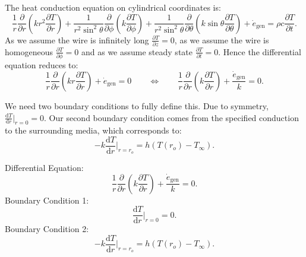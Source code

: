 \clearpage
\begin{derivation}
  \derivationpart
  The heat conduction equation on cylindrical coordinates is:
  \begin{equation*}
    \frac{1}{r} \frac{\partial }{\partial r} \left( k r^2 \frac{\partial T}{\partial r}  \right)+ \frac{1}{r^2 \sin^2 \theta} \frac{\partial }{\partial \phi} \left( k \frac{\partial T}{\partial \phi}  \right) + \frac{1}{r^2 \sin^2 \theta} \frac{\partial }{\partial \theta}  \left( k \sin \theta \frac{\partial T}{\partial \theta}  \right) + \dot{e}_{\text{gen}} = \rho c \frac{\partial T}{\partial t}
  .\end{equation*}
  As we assume the wire is infinitely long $\frac{\partial T}{\partial z}  = 0$, as we assume the wire is homogeneous $\frac{\partial T}{\partial \phi}  = 0$ and as we assume steady state $\frac{\partial T}{\partial t} = 0$.
  Hence the differential equation reduces to:
  \begin{equation*}
    \frac{1}{r} \frac{\partial }{\partial r} \left( k r \frac{\partial T}{\partial r}  \right) + \dot{e}_{\text{gen}} = 0 \qquad \iff \qquad \frac{1}{r} \frac{\partial }{\partial r} \left( k \frac{\partial T}{\partial r}  \right) + \frac{\dot{e}_{\text{gen}}}{k} = 0
  .\end{equation*}
  
  We need two boundary conditions to fully define this.
  Due to symmetry, $\frac{\mathrm{d}T}{\mathrm{d}r} \bigg|_{r = 0} = 0$.
  Our second boundary condition comes from the specified conduction to the surrounding media, which corresponds to:
  \begin{equation*}
    -k \frac{\mathrm{d}T}{\mathrm{d}r} \bigg|_{r = r_o}  = h \left( T(r_o) - T_{\infty} \right)
  .\end{equation*}
  
  \begin{subresult}
    Differential Equation:
    \begin{equation*}
      \frac{1}{r} \frac{\partial }{\partial r} \left( k \frac{\partial T}{\partial r}  \right) + \frac{\dot{e}_{\text{gen}}}{k} = 0
    .\end{equation*}
    Boundary Condition 1:
    \begin{equation*}
      \frac{\mathrm{d}T}{\mathrm{d}r}\bigg|_{r = 0} = 0 
    .\end{equation*}
    Boundary Condition 2:
    \begin{equation*}
      -k \frac{\mathrm{d}T}{\mathrm{d}r} \bigg|_{r = r_o} = h \left( T (r_o) - T_{\infty} \right)
    .\end{equation*}
  \end{subresult}


\end{derivation}
